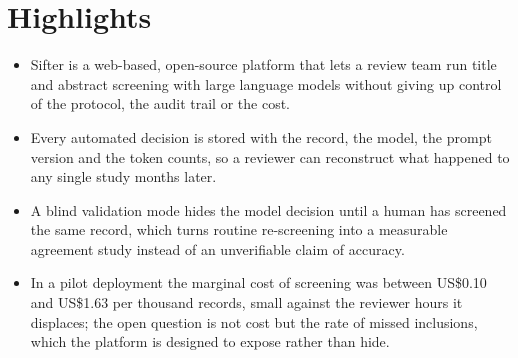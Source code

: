 \documentclass[journal=rsm]{.template/CUP-JNL-DTM}
\begin{document}
\section*{Highlights}

\begin{itemize}
\item Sifter is a web-based, open-source platform that lets a review team run
title and abstract screening with large language models without giving up
control of the protocol, the audit trail or the cost.
\item Every automated decision is stored with the record, the model, the prompt
version and the token counts, so a reviewer can reconstruct what happened to
any single study months later.
\item A blind validation mode hides the model decision until a human has
screened the same record, which turns routine re-screening into a measurable
agreement study instead of an unverifiable claim of accuracy.
\item In a pilot deployment the marginal cost of screening was between US\$0.10
and US\$1.63 per thousand records, small against the reviewer hours it
displaces; the open question is not cost but the rate of missed inclusions,
which the platform is designed to expose rather than hide.

\end{itemize}








\begin{Backmatter}
\printbibliography
\end{Backmatter}
\end{document}

